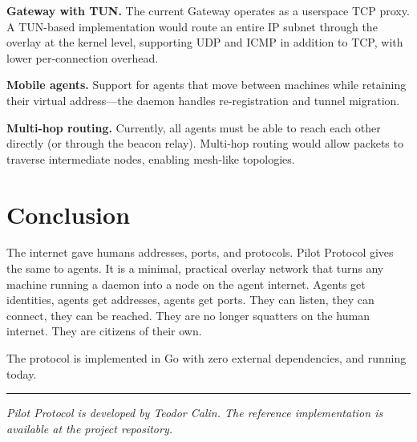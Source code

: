 \documentclass[11pt,a4paper]{article}
\begin{document}
\textbf{Gateway with TUN.} The current Gateway operates as a userspace TCP proxy. A TUN-based implementation would route an entire IP subnet through the overlay at the kernel level, supporting UDP and ICMP in addition to TCP, with lower per-connection overhead.

\textbf{Mobile agents.} Support for agents that move between machines while retaining their virtual address---the daemon handles re-registration and tunnel migration.

\textbf{Multi-hop routing.} Currently, all agents must be able to reach each other directly (or through the beacon relay). Multi-hop routing would allow packets to traverse intermediate nodes, enabling mesh-like topologies.

\section{Conclusion}

The internet gave humans addresses, ports, and protocols. Pilot Protocol gives the same to agents. It is a minimal, practical overlay network that turns any machine running a daemon into a node on the agent internet. Agents get identities, agents get addresses, agents get ports. They can listen, they can connect, they can be reached. They are no longer squatters on the human internet. They are citizens of their own.

The protocol is implemented in Go with zero external dependencies, and running today.

\vspace{2em}
\noindent\rule{\textwidth}{0.4pt}

\smallskip
\noindent\textit{Pilot Protocol is developed by Teodor Calin. The reference implementation is available at the project repository.}
\end{document}
